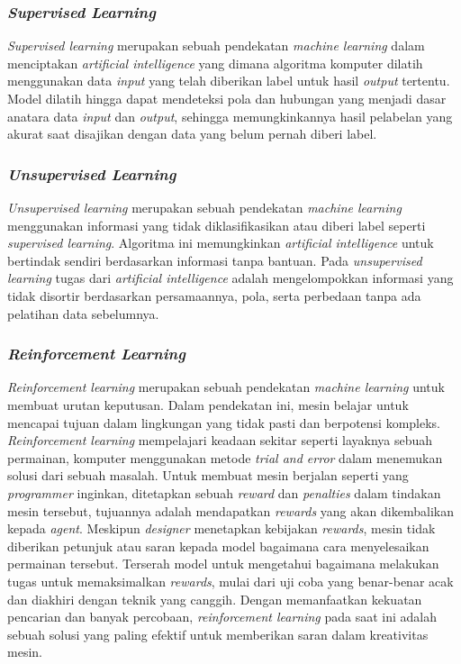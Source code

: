 \subsubsection{\emph{Supervised Learning}}
\label{subsec:supervisedlearning}

\emph{Supervised learning} merupakan sebuah pendekatan \emph{machine learning} dalam menciptakan
\emph{artificial intelligence} yang dimana algoritma komputer dilatih menggunakan data \emph{input} yang telah
diberikan label untuk hasil \emph{output} tertentu. Model dilatih hingga dapat mendeteksi pola dan hubungan yang menjadi dasar
anatara data \emph{input} dan \emph{output}, sehingga memungkinkannya hasil pelabelan yang akurat saat disajikan dengan data yang belum
pernah diberi label.

\subsubsection{\emph{Unsupervised Learning}}
\label{subsec:unspervisedlearning}

\emph{Unsupervised learning} merupakan sebuah pendekatan \emph{machine learning} menggunakan informasi yang tidak diklasifikasikan atau diberi label seperti
\emph{supervised learning}. Algoritma ini memungkinkan \emph{artificial intelligence} untuk bertindak sendiri berdasarkan informasi tanpa bantuan. Pada \emph{unsupervised learning} tugas dari
\emph{artificial intelligence} adalah mengelompokkan informasi yang tidak disortir berdasarkan
persamaannya, pola, serta perbedaan tanpa ada pelatihan data sebelumnya.
\subsubsection{\emph{Reinforcement Learning}}
\label{subsec:reinforcementlearning}

\emph{Reinforcement learning} merupakan sebuah pendekatan \emph{machine learning} untuk membuat urutan keputusan. Dalam pendekatan ini, mesin belajar untuk mencapai
tujuan dalam lingkungan yang tidak pasti dan berpotensi kompleks. \emph{Reinforcement learning} mempelajari keadaan sekitar seperti layaknya sebuah permainan, komputer menggunakan metode
\emph{trial and error} dalam menemukan solusi dari sebuah masalah. Untuk membuat mesin berjalan seperti yang \emph{programmer} inginkan, ditetapkan sebuah \emph{reward} dan \emph{penalties} dalam tindakan
mesin tersebut, tujuannya adalah mendapatkan \emph{rewards} yang akan dikembalikan kepada \emph{agent}. Meskipun \emph{designer} menetapkan kebijakan \emph{rewards}, mesin tidak diberikan petunjuk atau saran
kepada model bagaimana cara menyelesaikan permainan tersebut. Terserah model untuk mengetahui bagaimana melakukan tugas untuk memaksimalkan \emph{rewards}, mulai dari uji coba
yang benar-benar acak dan diakhiri dengan teknik yang canggih. Dengan memanfaatkan kekuatan pencarian dan banyak percobaan, \emph{reinforcement learning} pada saat ini adalah sebuah solusi 
yang paling efektif untuk memberikan saran dalam kreativitas mesin.

